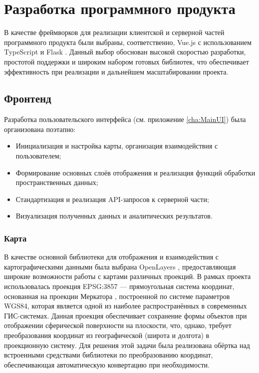 \chapter{Разработка программного продукта}

В качестве фреймворков для реализации клиентской и серверной частей программного продукта были выбраны, соответственно, Vue.js\cite{VueJS2023} с использованием TypeScript и Flask \cite{Flask2023}. Данный выбор обоснован высокой скоростью разработки, простотой поддержки и широким набором готовых библиотек, что обеспечивает эффективность при реализации и дальнейшем масштабировании проекта.

\section{Фронтенд}

Разработка пользовательского интерфейса (см. приложение \ref{cha:MainUI}) была организована поэтапно:

\begin{itemize}
	\item Инициализация и настройка карты, организация взаимодействия с пользователем;
	\item Формирование основных слоёв отображения и реализация функций обработки пространственных данных;
	\item Стандартизация и реализация API-запросов к серверной части;
	\item Визуализация полученных данных и аналитических результатов.
\end{itemize}

\subsection*{Карта}

В качестве основной библиотеки для отображения и взаимодействия с картографическими данными была выбрана OpenLayers \cite{OpenLayers2023}, предоставляющая широкие возможности работы с картами различных проекций. В рамках проекта использовалась проекция EPSG:3857 — прямоугольная система координат, основанная на проекции Меркатора \cite{Borovik2010}, построенной по системе параметров WGS84\cite{EPSG4326}, которая является одной из наиболее распространённых в современных ГИС-системах. Данная проекция обеспечивает сохранение формы объектов при отображении сферической поверхности на плоскости, что, однако, требует преобразования координат из географической (широта и долгота) в проекционную систему. Для решения этой задачи была реализована обёртка над встроенными средствами библиотеки по преобразованию координат, обеспечивающая автоматическую конвертацию при необходимости.

